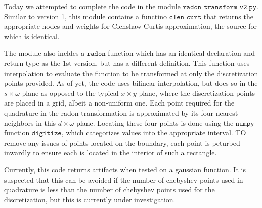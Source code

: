 
Today we attempted to complete the code in the module $\texttt{radon\_transform\_v2.py}$.
Similar to version 1, this module contains a functino $\texttt{clen\_curt}$ that returns the appropriate nodes and weights for Clenshaw-Curtis approximation, the source for which is identical.

The module also incldes a $\texttt{radon}$ function which has an identical declaration and return type as the 1st version, but has a different definition.
This function uses interpolation to evaluate the function to be transformed at only the discretization points provided.
As of yet, the code uses bilinear interpolation, but does so in the $s \times \omega$ plane as opposed to the typical $x \times y$ plane, where the discretization points are placed in a grid, albeit a non-uniform one.
Each point required for the quadrature in the radon transformation is approximated by its four nearest neighbors in this $d \times \omega$ plane.
Locating these four points is done using the $\texttt{numpy}$ function $\texttt{digitize}$, which categorizes values into the appropriate interval.
TO remove any issues of points located on the boundary, each point is peturbed inwardly to ensure each is located in the interior of such a rectangle.

Currently, this code returns artifacts when tested on a gaussian function. 
It is suspected that this can be avoided if the number of chebyshev points used in quadrature is less than the number of chebyshev points used for the discretization, but this is currently under investigation.